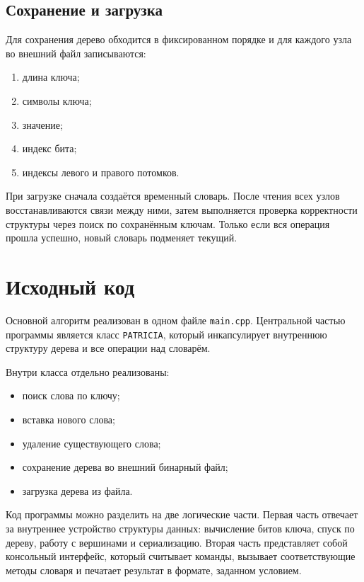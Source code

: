 \subsection{Сохранение и загрузка}

Для сохранения дерево обходится в фиксированном порядке и для каждого узла во внешний файл записываются:
\begin{enumerate}
    \item длина ключа;
    \item символы ключа;
    \item значение;
    \item индекс бита;
    \item индексы левого и правого потомков.
\end{enumerate}

При загрузке сначала создаётся временный словарь. После чтения всех узлов восстанавливаются связи между ними, затем выполняется проверка корректности структуры через поиск по сохранённым ключам. Только если вся операция прошла успешно, новый словарь подменяет текущий.

\section{Исходный код}

Основной алгоритм реализован в одном файле \texttt{main.cpp}. Центральной частью программы является класс \texttt{PATRICIA}, который инкапсулирует внутреннюю структуру дерева и все операции над словарём.

Внутри класса отдельно реализованы:
\begin{itemize}
    \item поиск слова по ключу;
    \item вставка нового слова;
    \item удаление существующего слова;
    \item сохранение дерева во внешний бинарный файл;
    \item загрузка дерева из файла.
\end{itemize}

Код программы можно разделить на две логические части. Первая часть отвечает за внутреннее устройство структуры данных: вычисление битов ключа, спуск по дереву, работу с вершинами и сериализацию. Вторая часть представляет собой консольный интерфейс, который считывает команды, вызывает соответствующие методы словаря и печатает результат в формате, заданном условием.

